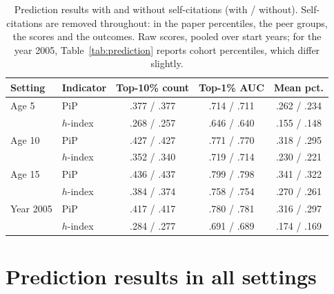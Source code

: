\documentclass[11pt]{article}
\begin{document}
\begin{table}[ht]
  \centering
  \small
  \caption{Prediction results with and without self-citations (with / without). Self-citations are removed
  throughout: in the paper percentiles, the peer groups, the scores and the outcomes. Raw scores, pooled over start
  years; for the year 2005, Table~\ref{tab:prediction} reports cohort percentiles, which differ slightly.}
  \label{tab:selfcites}
  \begin{tabular}{llccc}
    \toprule
    Setting & Indicator & Top-10\% count & Top-1\% AUC & Mean pct. \\
    \midrule
    Age 5 & PiP & .377 / .377 & .714 / .711 & .262 / .234 \\
          & $h$-index & .268 / .257 & .646 / .640 & .155 / .148 \\
    \addlinespace
    Age 10 & PiP & .427 / .427 & .771 / .770 & .318 / .295 \\
           & $h$-index & .352 / .340 & .719 / .714 & .230 / .221 \\
    \addlinespace
    Age 15 & PiP & .436 / .437 & .799 / .798 & .341 / .322 \\
           & $h$-index & .384 / .374 & .758 / .754 & .270 / .261 \\
    \addlinespace
    Year 2005 & PiP & .417 / .417 & .780 / .781 & .316 / .297 \\
              & $h$-index & .284 / .277 & .691 / .689 & .174 / .169 \\
    \bottomrule
  \end{tabular}
\end{table}

\clearpage
\section{Prediction results in all settings}
\label{app:prediction}
\end{document}
